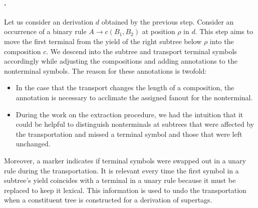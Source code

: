 \documentclass[../../document.tex]{subfiles}
\begin{document}
    \paragraph{.}
    Let us consider an  derivation \(d\) obtained by the previous step.
    Consider an occurrence of a binary rule $A \to c(B_1, B_2)$ at position \(\rho\) in \(d\).
    This step aims to move the first terminal from the yield of the right subtree below \(\rho\) into the composition \(c\).
    We descend into the subtree and transport terminal symbols accordingly while adjusting the compositions and adding annotations to the nonterminal symbols.
    The reason for these annotations is twofold:
    \begin{itemize}
        \item In the case that the transport changes the length of a composition, the annotation is necessary to acclimate the assigned fanout for the  nonterminal.
        \item
            During the work on the extraction procedure, we had the intuition that it could be helpful to distinguish nonterminals at subtrees that were affected by the transportation and missed a terminal symbol and those that were left unchanged.
    \end{itemize}
    Moreover, a marker indicates if terminal symbols were swapped out in a unary rule during the transportation.
    It is relevant every time the first symbol in a subtree's yield coincides with a terminal in a unary rule because it must be replaced to keep it lexical.
    This information is used to undo the transportation when a constituent tree is constructed for a derivation of supertags.
\end{document}
